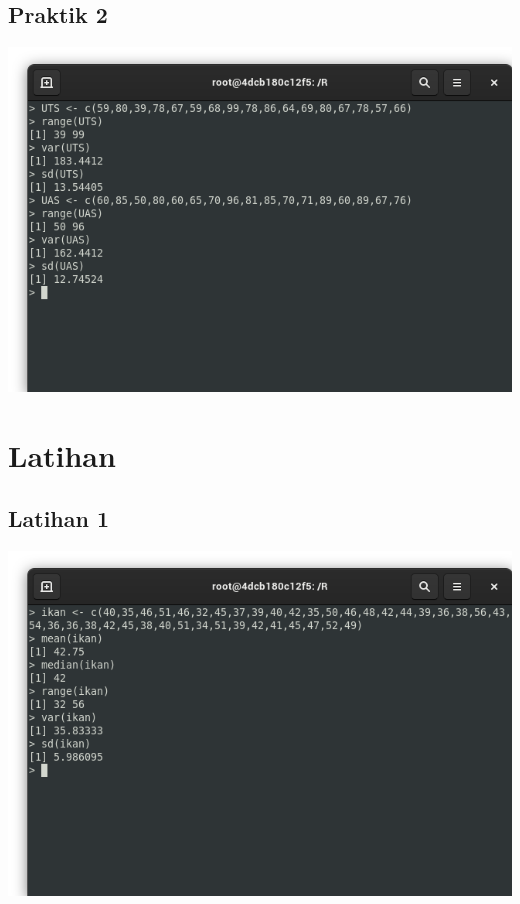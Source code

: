\documentclass[a4paper,12pt]{article}
\begin{document}
\subsection{Praktik 2}
\includegraphics[width=\linewidth]{praktik02}

\section{Latihan}
\subsection{Latihan 1}
\includegraphics[width=\linewidth]{latihan01}
\end{document}
